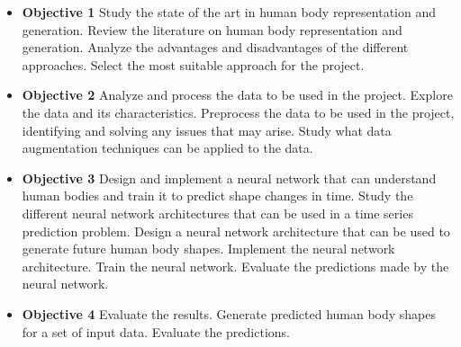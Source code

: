 \begin{itemize}
	\item \textbf{Objective 1} Study the state of the art in human body representation and
	      generation. \subitem Review the literature on human body representation and
	      generation. \subitem Analyze the advantages and disadvantages of the different
	      approaches. \subitem Select the most suitable approach for the project.
	\item \textbf{Objective 2} Analyze and process the data to be used in the project. \subitem
	      Explore the data and its characteristics. \subitem Preprocess the data to be
	      used in the project, identifying and solving any issues that may arise.
	      \subitem Study what data augmentation techniques can be applied to the data.
	\item \textbf{Objective 3} Design and implement a neural network that can understand human
	      bodies and train it to predict shape changes in time. \subitem Study the
	      different neural network architectures that can be used in a time series
	      prediction problem. \subitem Design a neural network architecture that can be
	      used to generate future human body shapes. \subitem Implement the neural
	      network architecture. \subitem Train the neural network. \subitem Evaluate the
	      predictions made by the neural network.
	\item \textbf{Objective 4} Evaluate the results. \subitem Generate predicted human body
	      shapes for a set of input data. \subitem Evaluate the predictions.
\end{itemize}

